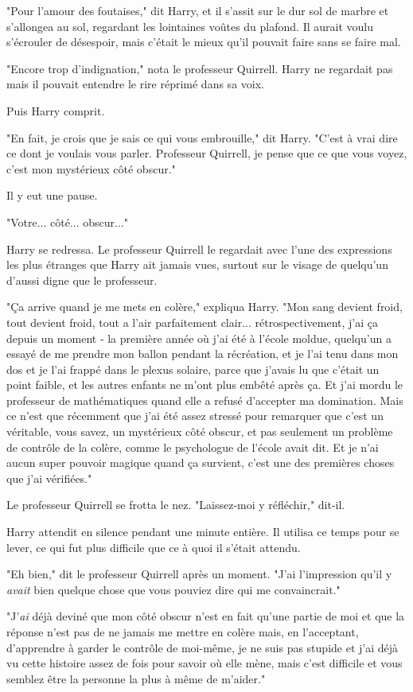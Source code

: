 "Pour l'amour des foutaises," dit Harry, et il s'assit sur le dur sol de marbre et s'allongea au sol, regardant les lointaines voûtes du plafond. Il aurait voulu s'écrouler de désespoir, mais c'était le mieux qu'il pouvait faire sans se faire mal.

"Encore trop d'indignation," nota le professeur Quirrell. Harry ne regardait pas mais il pouvait entendre le rire réprimé dans sa voix.

Puis Harry comprit.

"En fait, je crois que je sais ce qui vous embrouille," dit Harry. "C'est à vrai dire ce dont je voulais vous parler. Professeur Quirrell, je pense que ce que vous voyez, c'est mon mystérieux côté obscur."

Il y eut une pause.

"Votre... côté... obscur..."

Harry se redressa. Le professeur Quirrell le regardait avec l'une des expressions les plus étranges que Harry ait jamais vues, surtout sur le visage de quelqu'un d'aussi digne que le professeur.

"Ça arrive quand je me mets en colère," expliqua Harry. "Mon sang devient froid, tout devient froid, tout a l'air parfaitement clair... rétrospectivement, j'ai ça depuis un moment - la première année où j'ai été à l'école moldue, quelqu'un a essayé de me prendre mon ballon pendant la récréation, et je l'ai tenu dans mon dos et je l'ai frappé dans le plexus solaire, parce que j'avais lu que c'était un point faible, et les autres enfants ne m'ont plus embêté après ça. Et j'ai mordu le professeur de mathématiques quand elle a refusé d'accepter ma domination. Mais ce n'est que récemment que j'ai été assez stressé pour remarquer que c'est un véritable, vous savez, un mystérieux côté obscur, et pas seulement un problème de contrôle de la colère, comme le psychologue de l'école avait dit. Et je n'ai aucun super pouvoir magique quand ça survient, c'est une des premières choses que j'ai vérifiées."

Le professeur Quirrell se frotta le nez. "Laissez-moi y réfléchir," dit-il.

Harry attendit en silence pendant une minute entière. Il utilisa ce temps pour se lever, ce qui fut plus difficile que ce à quoi il s'était attendu.

"Eh bien," dit le professeur Quirrell après un moment. "J'ai l'impression qu'il y \emph{avait}  bien quelque chose que vous pouviez dire qui me convaincrait."

"J'\emph{ai}  déjà deviné que mon côté obscur n'est en fait qu'une partie de moi et que la réponse n'est pas de ne jamais me mettre en colère mais, en l'acceptant, d'apprendre à garder le contrôle de moi-même, je ne suis pas stupide et j'ai déjà vu cette histoire assez de fois pour savoir où elle mène, mais c'est difficile et vous semblez être la personne la plus à même de m'aider."


